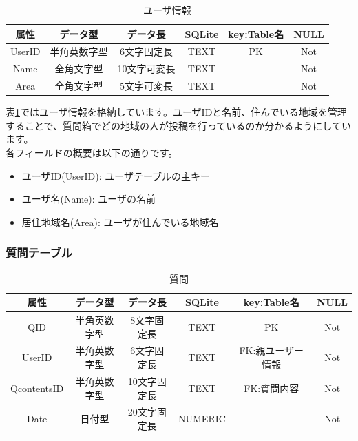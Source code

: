 \documentclass[a4j]{jarticle}
\begin{document}
\begin{table}[H]
    \caption{ユーザ情報}
    \label{tbl: user}
    \begin{center}
        \begin{tabular}{|c|c|c|c|c|c|} \hline
            属性 & データ型 & データ長 & SQLite & key:Table名 & NULL\\ \hline \hline
            UserID & 半角英数字型 & 6文字固定長 & TEXT & PK & Not\\ \hline
            Name & 全角文字型 & 10文字可変長 & TEXT & & Not\\ \hline
            Area & 全角文字型 & 5文字可変長 & TEXT & & Not\\ \hline
        \end{tabular}
    \end{center}
\end{table}

表\ref{tbl: user}ではユーザ情報を格納しています。ユーザIDと名前、住んでいる地域を管理することで、質問箱でどの地域の人が投稿を行っているのか分かるようにしています。\\
各フィールドの概要は以下の通りです。
\begin{itemize}
  \item ユーザID(UserID):
  ユーザテーブルの主キー
  \item ユーザ名(Name):
  ユーザの名前
  \item 居住地域名(Area):
  ユーザが住んでいる地域名
\end{itemize}

\subsubsection{質問テーブル}

\begin{table}[H]
    \caption{質問}
    \label{tbl: question}
    \begin{center}
        \begin{tabular}{|c|c|c|c|c|c|} \hline
            属性 & データ型 & データ長 & SQLite & key:Table名 & NULL\\ \hline \hline
            QID & 半角英数字型 & 8文字固定長 & TEXT & PK & Not\\ \hline
            UserID & 半角英数字型 & 6文字固定長 & TEXT & FK:親ユーザー情報 & Not\\ \hline
            QcontentsID & 半角英数字型 & 10文字固定長 & TEXT & FK:質問内容 & Not\\ \hline
            Date & 日付型 & 20文字固定長 & NUMERIC & & Not\\ \hline
        \end{tabular}
    \end{center}
\end{table}
\end{document}
